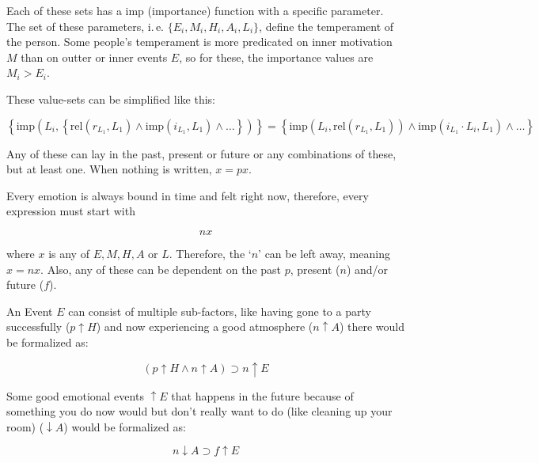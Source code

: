 \documentclass{scrartcl}
\begin{document}
Each of these sets has a imp (importance) function with a specific parameter. The set of these parameters, i.\,e. $\{E_i, M_i, H_i, A_i, L_i\}$, define the temperament of the
person. Some people's temperament is more predicated on inner motivation $M$ than on outter or inner events $E$, so for these, the importance values are $M_i > E_i$.

These value-sets can be simplified like this:

\begin{equation}
	\left\{\mathrm{imp}\left(L_i, \left\{\textrm{rel}\left(r_{L_1}, L_1\right) \wedge \textrm{imp}\left(i_{L_1}, L_1\right) \wedge \dots\right\}\right)\right\} =
	\left\{\mathrm{imp}\left(L_i, \textrm{rel}\left(r_{L_1}, L_1\right)\right) \wedge \textrm{imp}\left(i_{L_1} \cdot L_i, L_1\right) \wedge \dots\right\}
\end{equation}


Any of these can lay in the past, present or future or any combinations of these, but at least one. When nothing is written, $x = p x$. 

Every emotion is always bound in time and felt right now, therefore, every expression must start with

\begin{equation} n x \end{equation}

where $x$ is any of $E, M, H, A$ or $L$. Therefore, the `$n$' can be left away, meaning $x = n x$. Also, any of these can
be dependent on the past $p$, present ($n$) and/or future ($f$).

An Event $E$ can consist of multiple sub-factors, like having gone to a party successfully ($p \uparrow H$) and now experiencing a good atmosphere ($n \uparrow A$) 
there would be formalized as:

\begin{equation}
	\left(
		p \uparrow H \wedge n \uparrow A
	\right)
	\supset n \uparrow E 
\end{equation}

Some good emotional events $\uparrow E$ that happens in the future because of something you do now would but don't really want to do (like cleaning up
your room) ($\downarrow A$) would be formalized as:

\begin{equation}
	n \downarrow A \supset f \uparrow E
\end{equation}
\end{document}
